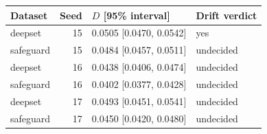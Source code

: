 \begin{tabular}{lrll}
\toprule
Dataset & Seed & $D$ [95\% interval] & Drift verdict\\
\midrule
deepset & 15 & 0.0505 [0.0470, 0.0542] & yes\\
safeguard & 15 & 0.0484 [0.0457, 0.0511] & undecided\\
deepset & 16 & 0.0438 [0.0406, 0.0474] & undecided\\
safeguard & 16 & 0.0402 [0.0377, 0.0428] & undecided\\
deepset & 17 & 0.0493 [0.0451, 0.0541] & undecided\\
safeguard & 17 & 0.0450 [0.0420, 0.0480] & undecided\\
\bottomrule\end{tabular}
